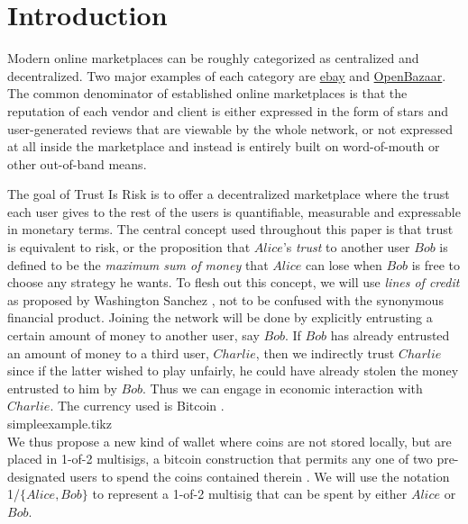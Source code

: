 \section{Introduction}
  Modern online marketplaces can be roughly categorized as centralized and decentralized.
  Two major examples of each category are \href{http://www.ebay.com}{ebay} and \href{https://openbazaar.org/}{OpenBazaar}.
  The common denominator of established online marketplaces is that the reputation of each vendor and client is either
  expressed in the form of stars and user-generated reviews that are viewable by the whole network, or not expressed at
  all inside the marketplace and instead is entirely built on word-of-mouth or other out-of-band means.

  The goal of Trust Is Risk is to offer a decentralized marketplace where the trust each user gives to the rest of the users
  is quantifiable, measurable and expressable in monetary terms. The central concept used throughout this paper is that trust
  is equivalent to risk, or the proposition that $Alice$'s \textit{trust} to another user $Bob$ is defined to be the
  \textit{maximum sum of money} that $Alice$ can lose when $Bob$ is free to choose any strategy he wants. To flesh out this
  concept, we will use \textit{lines of credit} as proposed by Washington Sanchez \cite{loc}, not to be confused with the
  synonymous financial product. Joining the network will be done by explicitly entrusting a certain amount of money to another
  user, say $Bob$. If $Bob$ has already entrusted an amount of money to a third user, $Charlie$, then we indirectly trust
  $Charlie$ since if the latter wished to play unfairly, he could have already stolen the money entrusted to him by $Bob$.
  Thus we can engage in economic interaction with $Charlie$. The currency used is Bitcoin \cite{bitcoin}.
  \medskip \ \\
  {simpleexample.tikz} \smallskip \ \\
  We thus propose a new kind of wallet where coins are not stored locally, but are placed in 1-of-2 multisigs, a bitcoin
  construction that permits any one of two pre-designated users to spend the coins contained therein \cite{masteringbitcoin}.
  We will use the notation 1/$\{Alice, Bob\}$ to represent a 1-of-2 multisig that can be spent by either $Alice$ or $Bob$.

